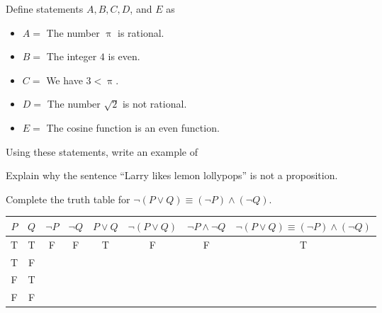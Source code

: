 \documentclass[12pt,fleqn]{exam}
\begin{document}
\begin{questions} 

\question [5] Define statements $A,B,C,D$, and $E$ as
\begin{itemize}
\item $A = $ The number $\uppi$ is rational.
\item $B = $ The integer  $4$ is even.
\item $C = $ We have $3 < \uppi$.
\item $D = $ The number $\sqrt{2}$ is not rational.
\item $E = $ The cosine function is an even function.
\end{itemize}

Using these statements, write an example of 


\question[5] Explain why the sentence ``Larry likes lemon lollypops''
is not a proposition.

\question [5] Complete the truth table for $\lnot  (P \lor Q) \equiv (\lnot P) \land (\lnot  Q)$.

\vspace{0.1in}
\begin{tabular}{|c|c|c|c|c|c|c|c|}
\hline 
\(P\) & \(Q\) & \(\lnot P \) & \(\lnot Q \) & \(P \lor Q\) &  \( \lnot (P \lor Q) \)& \(\lnot P \land  \lnot  Q\) & \(\lnot  (P \lor Q) \equiv (\lnot P)\land (\lnot  Q) \) \\  \hline \hline
 T  & T & F & F & T & F & F & T   \\  \hline
 T  & F &   &   &   &   &   &  \\ \hline 
 F  & T &   &   &   &   &   &  \\ \hline 
 F  & F &   &   &   &   &   &  \\ \hline 
\end{tabular}




\end{questions}
\end{document}
